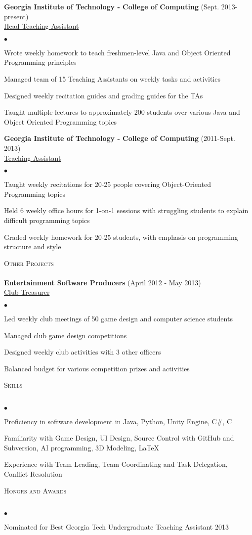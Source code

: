 \documentclass{article}
\newcommand{\lineunder}{\vspace*{-8pt} \\ \hspace*{-18pt} \hrulefill \\}
\newcommand{\header}[1]{{\hspace*{-15pt}\vspace*{6pt} \textsc{#1}} \vspace*{-6pt} \lineunder}
\newcommand{\employer}[3]{{ \textbf{#1} (#2)\\ \underline{{{#3}}}\\  }}
\newenvironment{achievements}{\begin{list}{$\bullet$}{\topsep 0pt \itemsep -2pt}}{\vspace*{4pt}\end{list}}
\begin{document}
\employer{Georgia Institute of Technology - College of Computing}{Sept. 2013-present}{Head Teaching Assistant}
    \begin{achievements}
    \item Wrote weekly homework to teach freshmen-level Java and Object Oriented Programming principles
	\item Managed team of 15 Teaching Assistants on weekly tasks and activities
	\item Designed weekly recitation guides and grading guides for the TAs
	\item Taught multiple lectures to approximately 200 students over various Java and Object Oriented Programming topics
	\end{achievements}
\employer{Georgia Institute of Technology - College of Computing}{2011-Sept. 2013}{Teaching Assistant}

	\begin{achievements}
	\item Taught weekly recitations for 20-25 people covering Object-Oriented Programming topics
	\item Held 6 weekly office hours for 1-on-1 sessions with struggling students to explain difficult programming topics
	\item Graded weekly homework for 20-25 students, with emphasis on programming structure and style
	\end{achievements}





\vspace*{18pt}
\header{Other Projects}
\employer{Entertainment Software Producers}{April 2012 - May 2013}{Club Treasurer}
    \begin{achievements}
    \item Led weekly club meetings of 50 game design and computer science students
    \item Managed club game design competitions
    \item Designed weekly club activities with 3 other officers
    \item Balanced budget for various competition prizes and activities
    \end{achievements}



\vspace*{18pt}
\header{Skills}
\begin{achievements}
\item Proficiency in software development in Java, Python, Unity Engine, C\#, C
\item Familiarity with Game Design, UI Design, Source Control with GitHub and Subversion, AI programming, 3D Modeling, \LaTeX
\item Experience with Team Leading, Team Coordinating and Task Delegation, Conflict Resolution
\end{achievements}

\vspace*{18pt}
\header{Honors and Awards}
\begin{achievements}
\item  Nominated for Best Georgia Tech Undergraduate Teaching Assistant 2013
\end{achievements}
\end{document}
